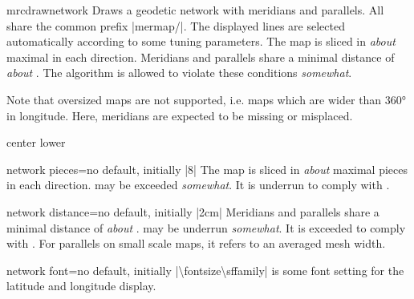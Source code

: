 \begin{docCommand}{mrcdrawnetwork}{}
  Draws a geodetic network with meridians and parallels.
  All  share the common prefix |mermap/|.
  The displayed lines are selected automatically according to some tuning
  parameters.
  The map is sliced in \emph{about} maximal  in each
  direction. Meridians and parallels share a minimal distance of
  \emph{about} . The algorithm is
  allowed to violate these conditions \emph{somewhat}.

  Note that oversized maps are not supported, i.e. maps which are wider
  than \ang{360} in longitude. Here, meridians are expected to be missing
  or misplaced.

%
\begin{dispExample*}{center lower}
\end{dispExample*}
\end{docCommand}


\begin{docMrcKey}{network pieces}{=}{no default, initially |8|}
  The map is sliced in \emph{about} maximal  pieces in each
  direction.  may be exceeded \emph{somewhat}.
  It is underrun to comply with .
\end{docMrcKey}


\begin{docMrcKey}{network distance}{=}{no default, initially |2cm|}
  Meridians and parallels share a minimal distance of
  \emph{about} .
   may be underrun \emph{somewhat}.
  It is exceeded to comply with .
  For parallels on small scale maps, it refers to an averaged mesh width.
\end{docMrcKey}

\begin{docMrcKey}{network font}{=}{no default, initially
  |\textbackslash fontsize\brackets{4pt}\brackets{4pt}\textbackslash sffamily|}
   is some font setting for the latitude and longitude display.
\end{docMrcKey}



